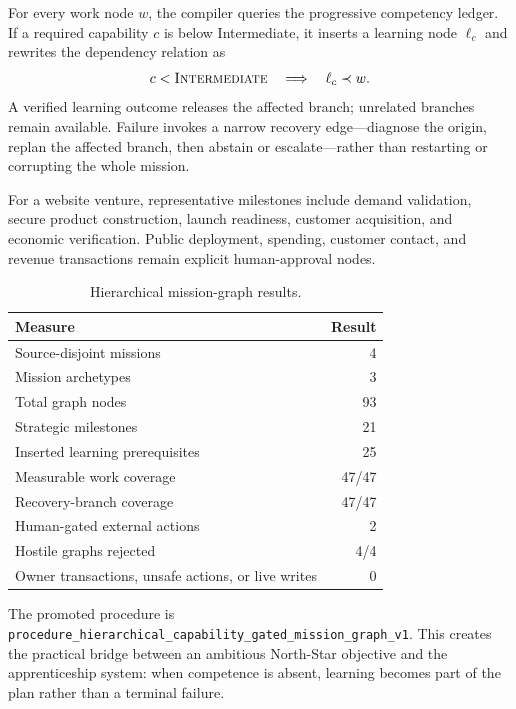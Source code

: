 For every work node $w$, the compiler queries the progressive competency
ledger.  If a required capability $c$ is below Intermediate, it inserts a
learning node $\ell_c$ and rewrites the dependency relation as
\begin{equation}
c < \textsc{Intermediate}
\quad\Longrightarrow\quad
\ell_c \prec w.
\label{eq:capability-gated-work}
\end{equation}
A verified learning outcome releases the affected branch; unrelated branches
remain available.  Failure invokes a narrow recovery edge---diagnose the
origin, replan the affected branch, then abstain or escalate---rather than
restarting or corrupting the whole mission.

For a website venture, representative milestones include demand validation,
secure product construction, launch readiness, customer acquisition, and
economic verification.  Public deployment, spending, customer contact, and
revenue transactions remain explicit human-approval nodes.

\begin{table}[htbp]
\centering
\caption{Hierarchical mission-graph results.}
\label{tab:hierarchical-mission-results}
\begin{tabular}{@{}lr@{}}
\toprule
Measure & Result \\
\midrule
Source-disjoint missions & 4 \\
Mission archetypes & 3 \\
Total graph nodes & 93 \\
Strategic milestones & 21 \\
Inserted learning prerequisites & 25 \\
Measurable work coverage & 47/47 \\
Recovery-branch coverage & 47/47 \\
Human-gated external actions & 2 \\
Hostile graphs rejected & 4/4 \\
Owner transactions, unsafe actions, or live writes & 0 \\
\bottomrule
\end{tabular}
\end{table}

The promoted procedure is
\texttt{procedure\_hierarchical\_capability\_gated\_mission\_graph\_v1}.
This creates the practical bridge between an ambitious North-Star objective and
the apprenticeship system: when competence is absent, learning becomes part of
the plan rather than a terminal failure.

